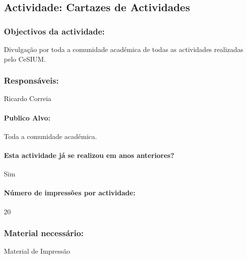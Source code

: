 
\subsection{Actividade: Cartazes de Actividades} 

\subsubsection*{Objectivos da actividade:}
\indent Divulgação por toda a comunidade académica de todas as actividades realizadas pelo CeSIUM.\\
\subsubsection*{Responsáveis:}
\begin{itemizedash}
	\item{Ricardo Correia}
\end{itemizedash}

\paragraph{Publico Alvo: }
Toda a comunidade académica.

\paragraph{Esta actividade já se realizou em anos anteriores?}
Sim

\paragraph{Número de impressões por actividade:}
20


\subsubsection*{Material necessário:}
\begin{itemizedash}
	\item{Material de Impressão}
\end{itemizedash}
